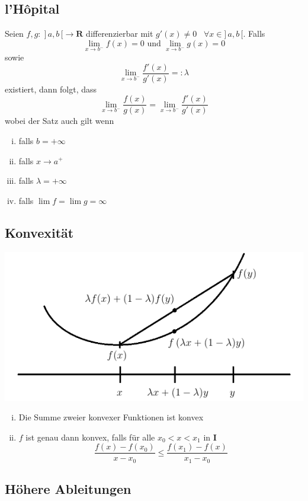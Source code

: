 \documentclass[8pt]{extarticle}
\begin{document}
\begin{multicols*}{3}
\subsection{l'Hôpital}

Seien $f, g: \; ]\,a, b\,[ \rightarrow \mathbf{R}$ differenzierbar mit $g'(x) \neq 0 \;\;\; \forall x \in ]\,a, b\,[$.
Falls $$\lim_{x \rightarrow b^-} f(x) = 0 \text{ und } \lim_{x \rightarrow b^-} g(x) = 0$$
sowie $$\lim_{x \rightarrow b^-} \frac{f'(x)}{g'(x)} =: \lambda$$ existiert, dann folgt, dass
$$\lim_{x \rightarrow b^-} \frac{f(x)}{g(x)} = \lim_{x \rightarrow b^-} \frac{f'(x)}{g'(x)}$$
wobei der Satz auch gilt wenn
\begin{enumerate}[(i)]
  \item falls $b = +\infty$
  \item falls $x \rightarrow a^+$
  \item falls $\lambda = +\infty$
  \item falls $\lim f = \lim g = \infty$
\end{enumerate}

\subsection{Konvexität}
\begin{center}
  \includegraphics[scale=0.4]{konvex.png}
\end{center}
\begin{enumerate}[(i)]
  \item Die Summe zweier konvexer Funktionen ist konvex
  \item $f$ ist genau dann konvex, falls für alle $x_0 < x < x_1$ in $\mathbf{I}$
  $$
    \frac{f(x) - f(x_0)}{x - x_0} \leq \frac{f(x_1) - f(x)}{x_1 - x_0}
  $$
\end{enumerate}

\subsection{Höhere Ableitungen}


\end{multicols*}
\end{document}
